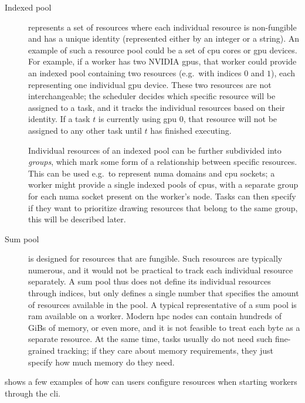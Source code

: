 \begin{description}
	\item [Indexed pool] represents a set of resources where each individual resource is
	      non-fungible and has a unique identity (represented either by an integer or a string). An example
	      of such a resource pool could be a set of \gls{cpu} cores or \gls{gpu}
	      devices. For example, if a worker has two NVIDIA \glspl{gpu}, that worker could provide
	      an indexed pool containing two resources (e.g.\ with indices $0$ and
	      $1$), each representing one individual \gls{gpu} device. These two
	      resources are not interchangeable; the scheduler decides which specific resource will be assigned
	      to a task, and it tracks the individual resources based on their identity. If a task
	      $t$ is currently using \gls{gpu} $0$, that
	      resource will not be assigned to any other task until $t$ has finished executing.

	      Individual resources of an indexed pool can be further subdivided into \emph{groups},
	      which mark some form of a relationship between specific resources. This can be used e.g.\ to
	      represent \gls{numa} domains and \gls{cpu} sockets; a worker might provide
	      a single indexed pools of \glspl{cpu}, with a separate group for each
	      \gls{numa} socket present on the worker's node. Tasks can then specify if they want to
	      prioritize drawing resources that belong to the same group, this will be described later.
	\item [Sum pool] is designed for resources that are fungible. Such resources are typically
	      numerous, and it would not be practical to track each individual resource separately. A sum pool
	      thus does not define its individual resources through indices, but only defines a single number
	      that specifies the amount of resources available in the pool. A typical representative of a sum
	      pool is \gls{ram} available on a worker. Modern \gls{hpc} nodes can
	      contain hundreds of GiBs of memory, or even more, and it is not feasible to treat each byte as a
	      separate resource. At the same time, tasks usually do not need such fine-grained tracking; if they
	      care about memory requirements, they just specify how much memory do they need.
\end{description}

 shows a few examples of how can users configure resources
when starting workers through the \gls{cli}.

